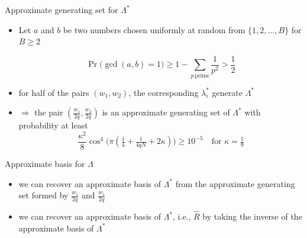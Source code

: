 \documentclass[slideColor]{prosper}
\renewcommand{\>}{\rangle}
\newcommand{\<}{\langle}
\begin{document}

\begin{slide}{Approximate generating set for $\Lambda^*$}
\begin{itemize}
\item Let $a$ and $b$ be two numbers chosen uniformly at random from $\{1,2,\ldots,B\}$ for $B\ge 2$

\[
\Pr\big( \gcd(a,b) = 1 \big) \ge 1 - \sum_{p \, \mathrm{prime}} \frac{1}{p^2} > \frac{1}{2}
\]

\medskip
\item for half of the pairs $(w_1,w_2)$, the corresponding $\lambda_i^*$ generate $\Lambda^*$

\medskip
\item $\Rightarrow$ the pair $(\tfrac{w_1}{2q},\tfrac{w_2}{2q})$ is an approximate generating set of $\Lambda^*$ with probability at least
\[
\frac{\kappa^2}{8} \cos^4\big( \pi (\tfrac{1}{4} + \tfrac{1}{4qN} + 2\kappa) \big) \ge 10^{-5} \quad \mbox{for } \kappa=\tfrac{1}{9}
\]
\end{itemize}

\end{slide}


\begin{slide}{Approximate basis for $\Lambda$}

\begin{itemize}

\item we can recover an approximate basis of $\Lambda^*$ from the approximate generating set formed by $\tfrac{w_1}{2q}$ and $\tfrac{w_1}{2q}$  

\medskip
\item we can recover an approximate basis of $\Lambda^*$, i.e., $\hat{R}$ by taking the inverse of the approximate basis of $\Lambda^*$

\end{itemize}

\end{slide}

\end{document}
